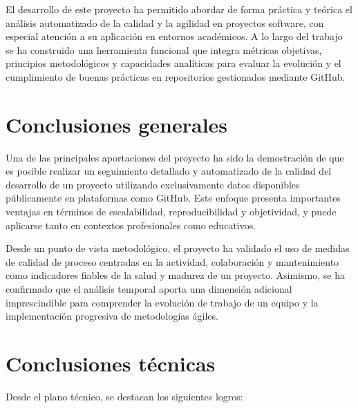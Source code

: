 
El desarrollo de este proyecto ha permitido abordar de forma práctica y teórica el análisis automatizado de la calidad y la agilidad en proyectos software, con especial atención a su aplicación en entornos académicos. A lo largo del trabajo se ha construido una herramienta funcional que integra métricas objetivas, principios metodológicos y capacidades analíticas para evaluar la evolución y el cumplimiento de buenas prácticas en repositorios gestionados mediante GitHub.

\section*{Conclusiones generales}

Una de las principales aportaciones del proyecto ha sido la demostración de que es posible realizar un seguimiento detallado y automatizado de la calidad del desarrollo de un proyecto utilizando exclusivamente datos disponibles públicamente en plataformas como GitHub. Este enfoque presenta importantes ventajas en términos de escalabilidad, reproducibilidad y objetividad, y puede aplicarse tanto en contextos profesionales como educativos.

Desde un punto de vista metodológico, el proyecto ha validado el uso de medidas de calidad de proceso centradas en la actividad, colaboración y mantenimiento como indicadores fiables de la salud y madurez de un proyecto. Asimismo, se ha confirmado que el análisis temporal aporta una dimensión adicional imprescindible para comprender la evolución de trabajo de un equipo y la implementación progresiva de metodologías ágiles.

\section*{Conclusiones técnicas}

Desde el plano técnico, se destacan los siguientes logros:

